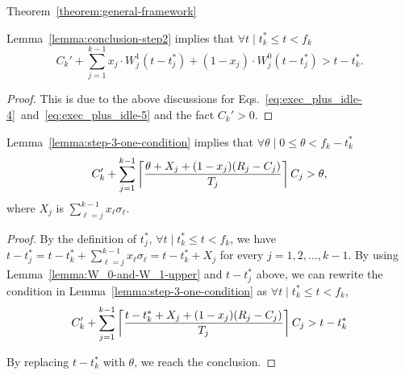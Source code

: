 \begin{appProof}{Theorem~\ref{theorem:general-framework}}
\begin{Lemma}
\label{lemma:step-3-one-condition}
Lemma~\ref{lemma:conclusion-step2} implies that
$\forall t \mid t_k^* \leq t < f_k$
\begin{equation}
\label{eq:exec_plus_idle-almost-final} 
C_k'+\sum_{j=1}^{k-1} x_j\cdot W_j^1(t-t_j^*) + (1-x_j)\cdot W_j^0(t-t_j^*) > t-t_k^*.
\end{equation}  
\end{Lemma}
\begin{proof}
  This is due to the above discussions for Eqs.~\eqref{eq:exec_plus_idle-4}~and~\eqref{eq:exec_plus_idle-5} and the fact $C_k' > 0$.
\end{proof}

\begin{Lemma}
\label{lemma:step-3-ceiling-condition}
Lemma~\ref{lemma:step-3-one-condition} implies that
$\forall \theta \mid 0 \leq \theta < f_k-t_k^*$
\begin{equation}
\label{eq:exec_plus_idle-almost-final-before-replacing-sigma} 
C_k'+\sum_{j=1}^{k-1} \ceiling{\frac{\theta+X_j+(1-x_j)(R_j-C_j)}{T_j}} C_j > \theta,
\end{equation}
where $X_j$ is $\sum_{\ell=j}^{k-1} x_\ell\sigma_\ell$. 
\end{Lemma}
\begin{proof}
  By the definition of $t_j^*$, $\forall t \mid t_k^* \leq t < f_k$,
  we have $t-t_j^* = t - t_k^* + \sum_{\ell=j}^{k-1}
  x_\ell\sigma_\ell = t-t_k^* + X_j$ for every $j=1,2,\ldots,k-1$. By using Lemma~\ref{lemma:W_0-and-W_1-upper} and $t-t_j^*$ above, we can rewrite the condition in Lemma~\ref{lemma:step-3-one-condition} as $\forall t \mid t_k^* \leq t < f_k$,
\begin{equation*}
C_k'+\sum_{j=1}^{k-1} \left\lceil{\frac{t-t_k^*+X_j+(1-x_j)(R_j-C_j)}{T_j}}\right\rceil C_j > t-t_k^*
\end{equation*}

  By replacing $t-t_k^*$ with $\theta$, we reach the conclusion.
\end{proof}


\end{appProof}

